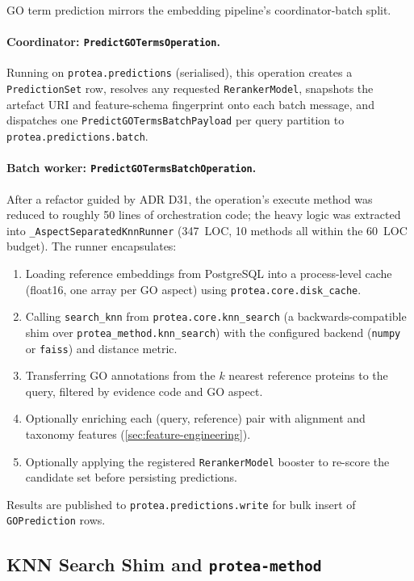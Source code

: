 GO term prediction mirrors the embedding pipeline's coordinator-batch
split.

\paragraph{Coordinator: \texttt{PredictGOTermsOperation}.}
Running on \texttt{protea.predictions} (serialised), this operation creates a
\texttt{PredictionSet} row, resolves any requested \texttt{RerankerModel},
snapshots the artefact URI and feature-schema fingerprint onto each batch
message, and dispatches one \texttt{PredictGOTermsBatchPayload} per query
partition to \texttt{protea.predictions.batch}.

\paragraph{Batch worker: \texttt{PredictGOTermsBatchOperation}.}
After a refactor guided by ADR D31, the operation's execute method was reduced
to roughly 50 lines of orchestration code; the heavy logic was extracted into
\texttt{\_AspectSeparatedKnnRunner} (347~LOC, 10 methods all within the 60~LOC
budget). The runner encapsulates:

\begin{enumerate}
  \item Loading reference embeddings from PostgreSQL into a process-level cache
    (float16, one array per GO aspect) using \texttt{protea.core.disk\_cache}.
  \item Calling \texttt{search\_knn} from \texttt{protea.core.knn\_search}
    (a backwards-compatible shim over \texttt{protea\_method.knn\_search})
    with the configured backend (\texttt{numpy} or \texttt{faiss}) and distance
    metric.
  \item Transferring GO annotations from the $k$ nearest reference proteins
    to the query, filtered by evidence code and GO aspect.
  \item Optionally enriching each (query, reference) pair with alignment and
    taxonomy features (\cref{sec:feature-engineering}).
  \item Optionally applying the registered \texttt{RerankerModel} booster to
    re-score the candidate set before persisting predictions.
\end{enumerate}

Results are published to \texttt{protea.predictions.write} for bulk insert
of \texttt{GOPrediction} rows.

\subsection{KNN Search Shim and \texttt{protea-method}}
\label{subsec:knn-shim}

